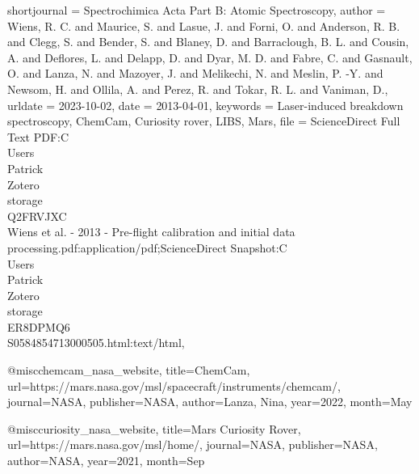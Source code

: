 {	shortjournal = {Spectrochimica Acta Part B: Atomic Spectroscopy},
	author = {Wiens, R. C. and Maurice, S. and Lasue, J. and Forni, O. and Anderson, R. B. and Clegg, S. and Bender, S. and Blaney, D. and Barraclough, B. L. and Cousin, A. and Deflores, L. and Delapp, D. and Dyar, M. D. and Fabre, C. and Gasnault, O. and Lanza, N. and Mazoyer, J. and Melikechi, N. and Meslin, P. -Y. and Newsom, H. and Ollila, A. and Perez, R. and Tokar, R. L. and Vaniman, D.},
	urldate = {2023-10-02},
	date = {2013-04-01},
	keywords = {Laser-induced breakdown spectroscopy, {ChemCam}, Curiosity rover, {LIBS}, Mars},
	file = {ScienceDirect Full Text PDF:C\:\\Users\\Patrick\\Zotero\\storage\\Q2FRVJXC\\Wiens et al. - 2013 - Pre-flight calibration and initial data processing.pdf:application/pdf;ScienceDirect Snapshot:C\:\\Users\\Patrick\\Zotero\\storage\\ER8DPMQ6\\S0584854713000505.html:text/html},
}

@misc{chemcam_nasa_website, title={ChemCam}, url={https://mars.nasa.gov/msl/spacecraft/instruments/chemcam/}, journal={NASA}, publisher={NASA}, author={Lanza, Nina}, year={2022}, month={May}}

@misc{curiosity_nasa_website, title={Mars Curiosity Rover}, url={https://mars.nasa.gov/msl/home/}, journal={NASA}, publisher={NASA}, author={NASA}, year={2021}, month={Sep}}

